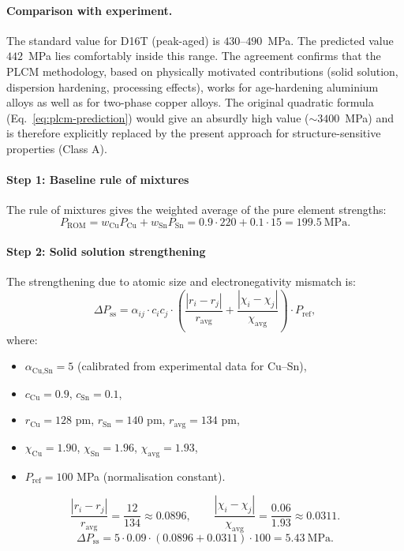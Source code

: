 \documentclass[12pt,a4paper]{article}
\begin{document}
	\paragraph{Comparison with experiment.}
	The standard value for D16T (peak-aged) is $430$--$490$~MPa.
	The predicted value $442$~MPa lies comfortably inside this range.
	The agreement confirms that the PLCM methodology, based on physically
	motivated contributions (solid solution, dispersion hardening, processing
	effects), works for age-hardening aluminium alloys as well as for
	two-phase copper alloys. The original quadratic formula (Eq.~\ref{eq:plcm-prediction})
	would give an absurdly high value ($\sim 3400$~MPa) and is therefore
	explicitly replaced by the present approach for structure-sensitive
	properties (Class A).
	
	\paragraph{Step 1: Baseline rule of mixtures}
	The rule of mixtures gives the weighted average of the pure element strengths:
	\[
	P_{\text{ROM}} = w_{\text{Cu}} P_{\text{Cu}} + w_{\text{Sn}} P_{\text{Sn}} = 0.9 \cdot 220 + 0.1 \cdot 15 = 199.5\ \text{MPa}.
	\]
	
	\paragraph{Step 2: Solid solution strengthening}
	The strengthening due to atomic size and electronegativity mismatch is:
	\[
	\Delta P_{\text{ss}} = \alpha_{ij} \cdot c_i c_j \cdot \left( \frac{|r_i - r_j|}{r_{\text{avg}}} + \frac{|\chi_i - \chi_j|}{\chi_{\text{avg}}} \right) \cdot P_{\text{ref}},
	\]
	where:
	\begin{itemize}
		\item \(\alpha_{\text{Cu,Sn}} = 5\) (calibrated from experimental data for Cu–Sn),
		\item \(c_{\text{Cu}}=0.9\), \(c_{\text{Sn}}=0.1\),
		\item \(r_{\text{Cu}}=128\) pm, \(r_{\text{Sn}}=140\) pm, \(r_{\text{avg}}=134\) pm,
		\item \(\chi_{\text{Cu}}=1.90\), \(\chi_{\text{Sn}}=1.96\), \(\chi_{\text{avg}}=1.93\),
		\item \(P_{\text{ref}} = 100\) MPa (normalisation constant).
	\end{itemize}
	\[
	\frac{|r_i - r_j|}{r_{\text{avg}}} = \frac{12}{134} \approx 0.0896, \qquad
	\frac{|\chi_i - \chi_j|}{\chi_{\text{avg}}} = \frac{0.06}{1.93} \approx 0.0311.
	\]
	\[
	\Delta P_{\text{ss}} = 5 \cdot 0.09 \cdot (0.0896 + 0.0311) \cdot 100 = 5.43\ \text{MPa}.
	\]
	
\end{document}

